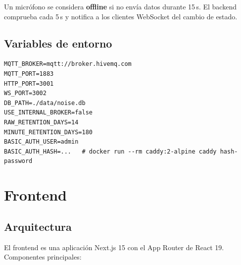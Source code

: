 \documentclass[11pt,a4paper,openany]{report}
\begin{document}
Un micr\'ofono se considera \textbf{offline} si no env\'ia datos durante 15\,s. El backend comprueba cada 5\,s y notifica a los clientes WebSocket del cambio de estado.

\section{Variables de entorno}

\begin{lstlisting}[caption={Plantilla \texttt{env.example} (renombrar a \texttt{.env})}]
MQTT_BROKER=mqtt://broker.hivemq.com
MQTT_PORT=1883
HTTP_PORT=3001
WS_PORT=3002
DB_PATH=./data/noise.db
USE_INTERNAL_BROKER=false
RAW_RETENTION_DAYS=14
MINUTE_RETENTION_DAYS=180
BASIC_AUTH_USER=admin
BASIC_AUTH_HASH=...   # docker run --rm caddy:2-alpine caddy hash-password
\end{lstlisting}

\chapter{Frontend}

\section{Arquitectura}

El frontend es una aplicaci\'on Next.js 15 con el App Router de React 19. Componentes principales:
\end{document}
